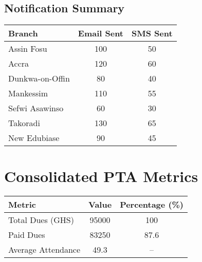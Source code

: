 \documentclass[a4paper,12pt]{article}
\begin{document}
\subsection*{Notification Summary}
\begin{tabular}{l c c}
    \toprule
    \textbf{Branch} & \textbf{Email Sent} & \textbf{SMS Sent} \\
    \midrule
    Assin Fosu & 100 & 50 \\
    Accra & 120 & 60 \\
    Dunkwa-on-Offin & 80 & 40 \\
    Mankessim & 110 & 55 \\
    Sefwi Asawinso & 60 & 30 \\
    Takoradi & 130 & 65 \\
    New Edubiase & 90 & 45 \\
    \bottomrule
\end{tabular}

\section*{Consolidated PTA Metrics}
\begin{tabular}{l S[table-format=6.0] c}
    \toprule
    \textbf{Metric} & \textbf{Value} & \textbf{Percentage (\%)} \\
    \midrule
    Total Dues (GHS) & 95000 & 100 \\
    Paid Dues & 83250 & 87.6 \\
    Average Attendance & 49.3 & -- \\
    \bottomrule
\end{tabular}
\end{document}
